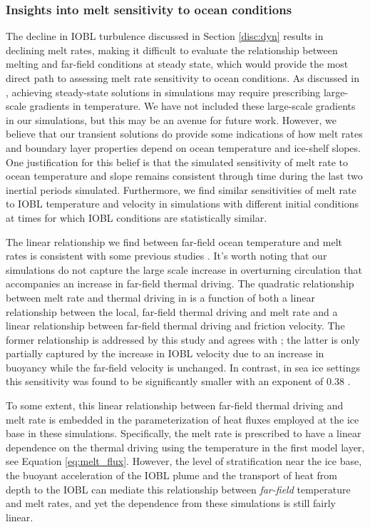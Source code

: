 \documentclass[draft]{agujournal2019}
\begin{document}
\subsubsection{Insights into melt sensitivity to ocean conditions}

The decline in IOBL turbulence discussed in Section \ref{disc:dyn} results in declining melt rates, making it difficult to evaluate the relationship between melting and far-field conditions at steady state, which would provide the most direct path to assessing melt rate sensitivity to ocean conditions. As discussed in , achieving steady-state solutions in simulations may require prescribing large-scale gradients in temperature. We have not included these large-scale gradients in our simulations, but this may be an avenue for future work. However, we believe that our transient solutions do provide some indications of how melt rates and boundary layer properties depend on ocean temperature and ice-shelf slopes. One justification for this belief is that the simulated sensitivity of melt rate to ocean temperature and slope remains consistent through time during the last two inertial periods simulated. Furthermore, we find similar sensitivities of melt rate to IOBL temperature and velocity in simulations with different initial conditions at times for which IOBL conditions are statistically similar.

The linear relationship we find between far-field ocean temperature and melt rates is consistent with some previous studies \cite{rignot_rapid_2002}. It's worth noting that our simulations do not capture the large scale increase in overturning circulation that accompanies an increase in far-field thermal driving. The quadratic relationship between melt rate and thermal driving in  is a function of both a linear relationship between the local, far-field thermal driving and melt rate and a linear relationship between far-field thermal driving and friction velocity. The former relationship is addressed by this study and agrees with ; the latter is only partially captured by the increase in IOBL velocity due to an increase in buoyancy while the far-field velocity is unchanged. In contrast, in sea ice settings this sensitivity was found to be significantly smaller with an exponent of 0.38 \cite{ramudu_large_2018}. 

To some extent, this linear relationship between far-field thermal driving and melt rate is embedded in the parameterization of heat fluxes employed at the ice base in these simulations. Specifically, the melt rate is prescribed to have a linear dependence on the thermal driving using the temperature in the first model layer, see Equation \ref{eq:melt_flux}. However, the level of stratification near the ice base, the buoyant acceleration of the IOBL plume and the transport of heat from depth to the IOBL can mediate this relationship between \textit{far-field} temperature and melt rates, and yet the dependence from these simulations is still fairly linear.  
\end{document}
